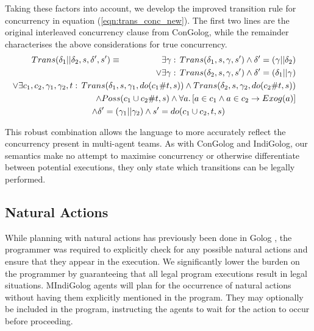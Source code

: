 Taking these factors into account, we develop the improved transition
rule for concurrency in equation (\ref{eqn:trans_conc_new}). The
first two lines are the original interleaved concurrency clause from
ConGolog, while the remainder characterises the above considerations
for true concurrency.\begin{multline}
Trans(\delta_{1}||\delta_{2},s,\delta',s')\equiv\,\,\,\,\,\,\,\,\,\,\,\,\,\,\,\,\,\,\,\,\,\,\,\,\,\,\,\,\shoveright{\exists\gamma:\, Trans(\delta_{1},s,\gamma,s')\wedge\delta'=(\gamma||\delta_{2})}\\
\shoveright{\vee\exists\gamma:\, Trans(\delta_{2},s,\gamma,s')\wedge\delta'=(\delta_{1}||\gamma)}\\
\shoveright{\vee\exists c_{1},c_{2},\gamma_{1},\gamma_{2},t:\, Trans(\delta_{1},s,\gamma_{1},do(c_{1}\#t,s))\wedge Trans(\delta_{2},s,\gamma_{2},do(c_{2}\#t,s))}\\
\shoveright{\wedge Poss(c_{1}\cup c_{2}\#t,s)\wedge\forall a.\left[a\in c_{1}\wedge a\in c_{2}\rightarrow Exog(a)\right]}\\
\wedge\delta'=(\gamma_{1}||\gamma_{2})\wedge s'=do(c_{1}\cup c_{2},t,s)\label{eqn:trans_conc_new}\end{multline}


This robust combination allows the language to more accurately reflect
the concurrency present in multi-agent teams. As with ConGolog and
IndiGolog, our semantics make no attempt to maximise concurrency or
otherwise differentiate between potential executions, they only state
which transitions can be legally performed.


\subsection{Natural Actions}

While planning with natural actions has previously been done in Golog
\citep{pirri00planning_nat_acts}, the programmer was required to
explicitly check for any possible natural actions and ensure that
they appear in the execution. We significantly lower the burden on
the programmer by guaranteeing that all legal program executions result
in legal situations. MIndiGolog agents will plan for the occurrence
of natural actions without having them explicitly mentioned in the
program. They may optionally be included in the program, instructing
the agents to wait for the action to occur before proceeding.

